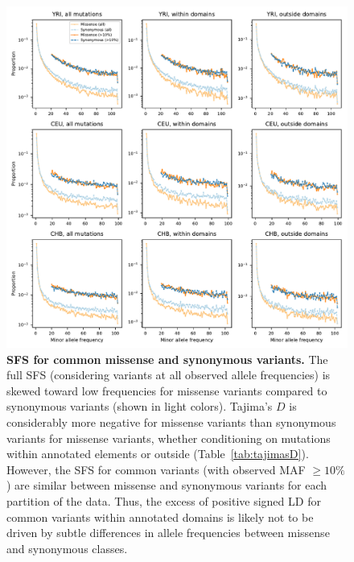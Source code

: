 \documentclass[]{article}
\begin{document}
\begin{figure}[ht!]
    \centering
    \includegraphics[width=\textwidth]{../figures/SFS_proportions}
    \caption{
        \textbf{SFS for common missense and synonymous variants.}
        The full SFS (considering variants at all observed allele frequencies) is
        skewed toward low frequencies for missense variants compared to synonymous
        variants (shown in light colors). Tajima's $D$ is considerably more negative
        for missense variants than synonymous variants for missense variants, whether
        conditioning on mutations within annotated elements or outside
        (Table~\ref{tab:tajimasD}). However, the SFS for common variants (with
        observed MAF $\geq 10\%$) are similar between missense and synonymous variants
        for each partition of the data. Thus, the excess of positive signed LD for
        common variants within annotated domains is likely not to be driven by
        subtle differences in allele frequencies between missense and synonymous
        classes.
    }
    \label{fig:sfs_proportions}
\end{figure}
\end{document}
